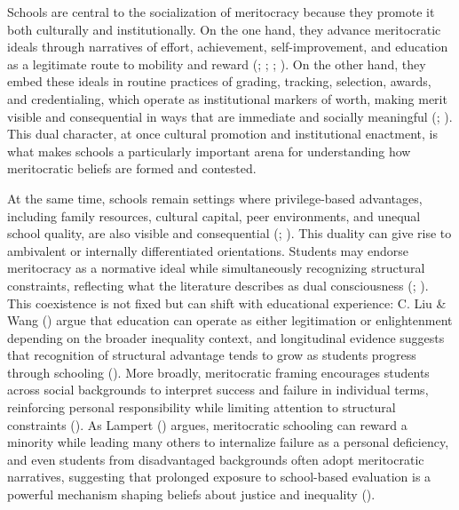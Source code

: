 \documentclass[
  13pt,
]{article}
\begin{document}
Schools are central to the socialization of meritocracy because they
promote it both culturally and institutionally. On the one hand, they
advance meritocratic ideals through narratives of effort, achievement,
self-improvement, and education as a legitimate route to mobility and
reward (;
;
;
). On the
other hand, they embed these ideals in routine practices of grading,
tracking, selection, awards, and credentialing, which operate as
institutional markers of worth, making merit visible and consequential
in ways that are immediate and socially meaningful
(;
). This dual
character, at once cultural promotion and institutional enactment, is
what makes schools a particularly important arena for understanding how
meritocratic beliefs are formed and contested.

At the same time, schools remain settings where privilege-based
advantages, including family resources, cultural capital, peer
environments, and unequal school quality, are also visible and
consequential (;
). This
duality can give rise to ambivalent or internally differentiated
orientations. Students may endorse meritocracy as a normative ideal
while simultaneously recognizing structural constraints, reflecting what
the literature describes as dual consciousness
(;
). This
coexistence is not fixed but can shift with educational experience: C.
Liu \& Wang () argue that education
can operate as either legitimation or enlightenment depending on the
broader inequality context, and longitudinal evidence suggests that
recognition of structural advantage tends to grow as students progress
through schooling (). More broadly, meritocratic framing encourages students across
social backgrounds to interpret success and failure in individual terms,
reinforcing personal responsibility while limiting attention to
structural constraints (). As Lampert
() argues, meritocratic
schooling can reward a minority while leading many others to internalize
failure as a personal deficiency, and even students from disadvantaged
backgrounds often adopt meritocratic narratives, suggesting that
prolonged exposure to school-based evaluation is a powerful mechanism
shaping beliefs about justice and inequality
().
\end{document}
